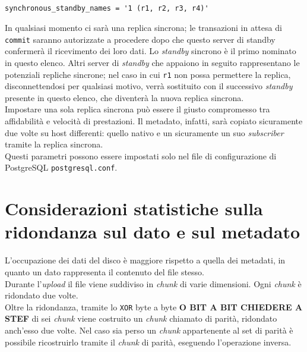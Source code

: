 \begin{verbatim}

synchronous_standby_names = '1 (r1, r2, r3, r4)'

\end{verbatim}

In qualsiasi momento ci sar\`{a} una replica sincrona; le transazioni in attesa di \verb"commit" saranno autorizzate a procedere dopo che questo server di standby confermer\`{a} il ricevimento dei loro dati. 
Lo \textit{standby} sincrono \`{e} il primo nominato in questo elenco. Altri server di \textit{standby} che appaiono in seguito rappresentano le potenziali repliche sincrone; nel caso in cui \verb"r1" non possa permettere la replica, disconnettendosi per qualsiasi motivo, verr\`{a} sostituito con il successivo \textit{standby} presente in questo elenco, che diventer\`{a} la nuova replica sincrona. \\

Impostare una sola replica sincrona pu\`{o} essere il giusto compromesso tra affidabilit\`{a} e velocit\`{a} di prestazioni. Il metadato, infatti, sar\`{a} copiato sicuramente due volte su host differenti: quello nativo e un sicuramente un suo \textit{subscriber} tramite la replica sincrona.\\

Questi parametri possono essere impostati solo nel file di configurazione di PostgreSQL \verb"postgresql.conf".

\section{Considerazioni statistiche sulla ridondanza sul dato e sul metadato}
L'occupazione dei dati del disco \`{e} maggiore rispetto a quella dei metadati, in quanto un dato rappresenta il contenuto del file stesso.\\

Durante l'\textit{upload} il file viene suddiviso in \textit{chunk} di varie dimensioni. Ogni \textit{chunk} \`{e} ridondato due volte.\\
Oltre la ridondanza, tramite lo \verb"XOR" byte a byte \textbf{O BIT A BIT CHIEDERE A STEF} di sei \textit{chunk} viene costruito un \textit{chunk} chiamato di parit\`{a}, ridondato anch'esso due volte. 
Nel caso sia perso un \textit{chunk} appartenente al set di parit\`{a} \`{e} possibile ricostruirlo tramite il \textit{chunk} di parit\`{a}, eseguendo l'operazione inversa.

